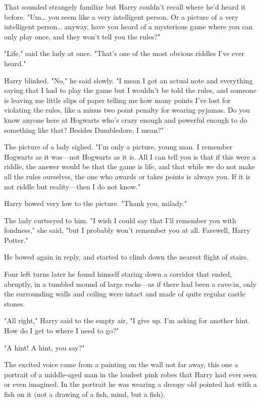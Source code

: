 That sounded strangely familiar but Harry couldn't recall where he'd heard it 
before. "Um{\ldots} you seem like a very intelligent person. Or a picture of a 
very intelligent person{\ldots} anyway, have you heard of a mysterious game 
where you can only play once, and they won't tell you the rules?"

"Life," said the lady at once. "That's one of the most obvious riddles I've 
ever heard."

Harry blinked. "No," he said slowly. "I mean I got an actual note and 
everything saying that I had to play the game but I wouldn't be told the rules, 
and someone is leaving me little slips of paper telling me how many points I've 
lost for violating the rules, like a minus two point penalty for wearing 
pyjamas. Do you know anyone here at Hogwarts who's crazy enough and powerful 
enough to do something like that? Besides Dumbledore, I mean?"

The picture of a lady sighed. "I'm only a picture, young man. I remember 
Hogwarts as it was---not Hogwarts as it is. All I can tell you is that if this 
were a riddle, the answer would be that the game is life, and that while we do 
not make all the rules ourselves, the one who awards or takes points is always 
you. If it is not riddle but reality---then I do not know."

Harry bowed very low to the picture. "Thank you, milady."

The lady curtseyed to him. "I wish I could say that I'll remember you with 
fondness," she said, "but I probably won't remember you at all. Farewell, Harry 
Potter."

He bowed again in reply, and started to climb down the nearest flight of stairs.

Four left turns later he found himself staring down a corridor that ended, 
abruptly, in a tumbled mound of large rocks---as if there had been a cave-in, 
only the surrounding walls and ceiling were intact and made of quite regular 
castle stones.

"All right," Harry said to the empty air, "I give up. I'm asking for another 
hint. How do I get to where I need to go?"

"A hint! A hint, you say?"

The excited voice came from a painting on the wall not far away, this one a 
portrait of a middle-aged man in the loudest pink robes that Harry had ever 
seen or even imagined. In the portrait he was wearing a droopy old pointed hat 
with a fish on it (not a drawing of a fish, mind, but a fish).

